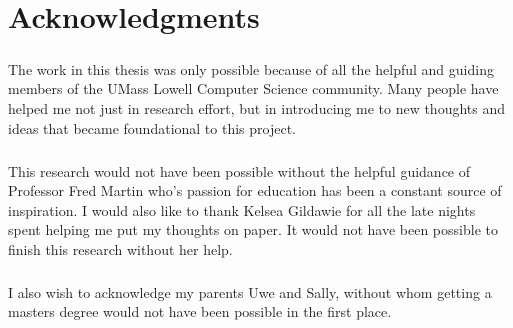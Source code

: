 \chapter*{Acknowledgments}
\renewcommand{\thefootnote}{\fnsymbol{footnote}}

\paragraph{}
 The work in this thesis was only possible because of all the helpful and guiding members of the UMass Lowell Computer Science community. 
 Many people have helped me not just in research effort, but in introducing me to new thoughts and ideas that became foundational to this project. 

\paragraph{}
This research would not have been possible without the helpful guidance of Professor Fred Martin who's passion for education has been a constant source of inspiration.
I would also like to thank Kelsea Gildawie for all the late nights spent helping me put my thoughts on paper.
It would not have been possible to finish this research without her help.

\paragraph{}
I also wish to acknowledge my parents Uwe and Sally, without whom getting a masters degree would not have been possible in the first place.
 

